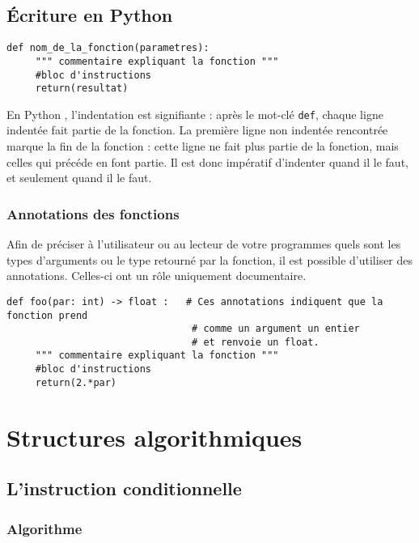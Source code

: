 \subsection{\'Ecriture en Python }

\begin{lstlisting}
def nom_de_la_fonction(parametres):
     """ commentaire expliquant la fonction """
     #bloc d'instructions
     return(resultat)
\end{lstlisting}

\begin{rem}
En Python , l'indentation est {signifiante} : après le mot-clé \texttt{def}, chaque 
ligne indentée fait partie de la fonction. La première ligne non indentée rencontrée marque la 
fin de la fonction : cette ligne ne fait plus partie de la fonction, mais celles qui précéde en 
font partie. Il est donc {impératif} d'indenter quand il le faut, et seulement 
quand il le faut.%
\end{rem}

\subsubsection*{Annotations des fonctions}

Afin de préciser à l'utilisateur ou au lecteur de votre programmes quels sont les types d'arguments ou le type retourné par la fonction, il est possible d'utiliser des annotations. Celles-ci ont un rôle uniquement documentaire.
\begin{lstlisting}
def foo(par: int) -> float :   # Ces annotations indiquent que la fonction prend 
                                # comme un argument un entier 
                                # et renvoie un float.
     """ commentaire expliquant la fonction """
     #bloc d'instructions
     return(2.*par)
\end{lstlisting}

\section{Structures algorithmiques}
\subsection{L'instruction conditionnelle}

\subsubsection{Algorithme}

